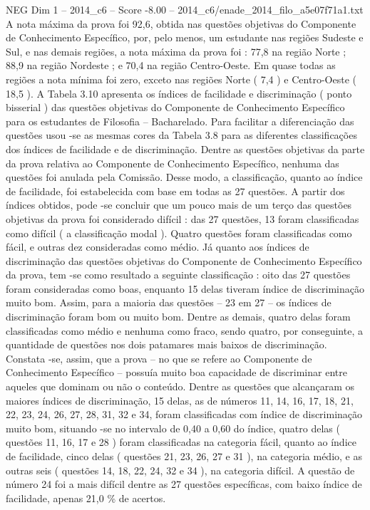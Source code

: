 \begin{textsample}{NEG Dim 1 – 2014\_c6 – Score -8.00 – 2014\_c6/enade\_2014\_filo\_a5e07f71a1.txt}
A nota máxima da prova foi 92,6, obtida nas questões objetivas do Componente de Conhecimento Específico, por, pelo menos, um estudante nas regiões Sudeste e Sul, e nas demais regiões, a nota máxima da prova foi : 77,8 na região Norte ; 88,9 na região Nordeste ; e 70,4 na região Centro-Oeste.
Em quase todas as regiões a nota mínima foi zero, exceto nas regiões Norte ( 7,4 ) e Centro-Oeste ( 18,5 ).
A Tabela 3.10 apresenta os índices de facilidade e discriminação ( ponto bisserial ) das questões objetivas do Componente de Conhecimento Específico para os estudantes de Filosofia – Bacharelado.
Para facilitar a diferenciação das questões usou -se as mesmas cores da Tabela 3.8 para as diferentes classificações dos índices de facilidade e de discriminação.
Dentre as questões objetivas da parte da prova relativa ao Componente de Conhecimento Específico, nenhuma das questões foi anulada pela Comissão.
Desse modo, a classificação, quanto ao índice de facilidade, foi estabelecida com base em todas as 27 questões.
A partir dos índices obtidos, pode -se concluir que um pouco mais de um terço das questões objetivas da prova foi considerado difícil : das 27 questões, 13 foram classificadas como difícil ( a classificação modal ).
Quatro questões foram classificadas como fácil, e outras dez consideradas como médio.
Já quanto aos índices de discriminação das questões objetivas do Componente de Conhecimento Específico da prova, tem -se como resultado a seguinte classificação : oito das 27 questões foram consideradas como boas, enquanto 15 delas tiveram índice de discriminação muito bom.
Assim, para a maioria das questões – 23 em 27 – os índices de discriminação foram bom ou muito bom.
Dentre as demais, quatro delas foram classificadas como médio e nenhuma como fraco, sendo quatro, por conseguinte, a quantidade de questões nos dois patamares mais baixos de discriminação.
Constata -se, assim, que a prova – no que se refere ao Componente de Conhecimento Específico – possuía muito boa capacidade de discriminar entre aqueles que dominam ou não o conteúdo.
Dentre as questões que alcançaram os maiores índices de discriminação, 15 delas, as de números 11, 14, 16, 17, 18, 21, 22, 23, 24, 26, 27, 28, 31, 32 e 34, foram classificadas com índice de discriminação muito bom, situando -se no intervalo de 0,40 a 0,60 do índice, quatro delas ( questões 11, 16, 17 e 28 ) foram classificadas na categoria fácil, quanto ao índice de facilidade, cinco delas ( questões 21, 23, 26, 27 e 31 ), na categoria médio, e as outras seis ( questões 14, 18, 22, 24, 32 e 34 ), na categoria difícil.
A questão de número 24 foi a mais difícil dentre as 27 questões específicas, com baixo índice de facilidade, apenas 21,0 \% de acertos.

\end{textsample}
